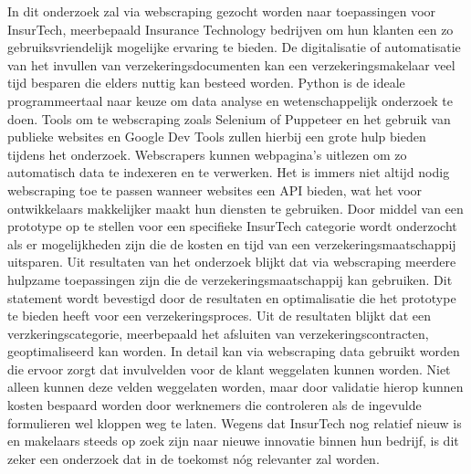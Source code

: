 In dit onderzoek zal via webscraping gezocht worden naar toepassingen voor InsurTech, meerbepaald Insurance Technology bedrijven om hun klanten een zo gebruiksvriendelijk mogelijke ervaring te bieden. De digitalisatie of automatisatie van het invullen van verzekeringsdocumenten kan een verzekeringsmakelaar veel tijd besparen die elders nuttig kan besteed worden. Python is de ideale programmeertaal naar keuze om data analyse en wetenschappelijk onderzoek te doen. Tools om te webscraping zoals Selenium of Puppeteer en het gebruik van publieke websites en Google Dev Tools zullen hierbij een grote hulp bieden tijdens het onderzoek. Webscrapers kunnen webpagina’s uitlezen om zo automatisch data te indexeren en te verwerken. Het is immers niet altijd nodig webscraping toe te passen wanneer websites een API bieden, wat het voor ontwikkelaars makkelijker maakt hun diensten te gebruiken. Door middel van een prototype op te stellen voor een specifieke InsurTech categorie wordt onderzocht als er mogelijkheden zijn die de kosten en tijd van een verzekeringsmaatschappij uitsparen. Uit resultaten van het onderzoek blijkt dat via webscraping meerdere hulpzame toepassingen zijn die de verzekeringsmaatschappij kan gebruiken. Dit statement wordt bevestigd door de resultaten en optimalisatie die het prototype te bieden heeft voor een verzekeringsproces. Uit de resultaten blijkt dat een verzkeringscategorie, meerbepaald het afsluiten van verzekeringscontracten, geoptimaliseerd kan worden. In detail kan via webscraping data gebruikt worden die ervoor zorgt dat invulvelden voor de klant weggelaten kunnen worden. Niet alleen kunnen deze velden weggelaten worden, maar door validatie hierop kunnen kosten bespaard worden door werknemers die controleren als de ingevulde formulieren wel kloppen weg te laten. Wegens dat InsurTech nog relatief nieuw is en makelaars steeds op zoek zijn naar nieuwe innovatie binnen hun bedrijf, is dit zeker een onderzoek dat in de toekomst nóg relevanter zal worden.
